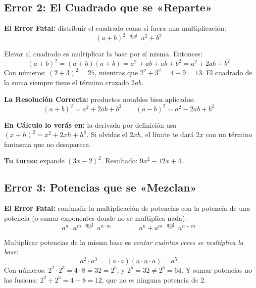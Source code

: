 \documentclass[12pt, letterpaper]{article}
\begin{document}
\subsection{Error 2: El Cuadrado que se «Reparte»}

\begin{cuadroadvertencia}
  \textbf{El Error Fatal:} distribuir el cuadrado como si fuera una multiplicación:
  \[
    (a + b)^2 \;\overset{\text{mal}}{=}\; a^2 + b^2
  \]
\end{cuadroadvertencia}

Elevar al cuadrado es multiplicar la base por sí misma. Entonces:
\[
  (a + b)^2 = (a + b)(a + b) = a^2 + ab + ab + b^2 = a^2 + 2ab + b^2
\]
Con números: $(2 + 3)^2 = 25$, mientras que $2^2 + 3^2 = 4 + 9 = 13$. El cuadrado de la suma siempre tiene el término cruzado $2ab$.

\begin{cuadrosolucion}
  \textbf{La Resolución Correcta:} productos notables bien aplicados:
  \[
    (a + b)^2 = a^2 + 2ab + b^2 \qquad (a - b)^2 = a^2 - 2ab + b^2
  \]
\end{cuadrosolucion}

\noindent\textbf{En Cálculo lo verás en:} la derivada por definición usa $(x + h)^2 = x^2 + 2xh + h^2$. Si olvidas el $2xh$, el límite te dará $2x$ con un término fantasma que no desaparece.

\noindent\textbf{Tu turno:} expande $(3x - 2)^2$. Resultado: $9x^2 - 12x + 4$.

\subsection{Error 3: Potencias que se «Mezclan»}

\begin{cuadroadvertencia}
  \textbf{El Error Fatal:} confundir la multiplicación de potencias con la potencia de una potencia (o sumar exponentes donde no se multiplica nada):
  \[
    a^n \cdot a^m \;\overset{\text{mal}}{=}\; a^{n \cdot m} \qquad\qquad
    a^n + a^m \;\overset{\text{mal}}{=}\; a^{n + m}
  \]
\end{cuadroadvertencia}

Multiplicar potencias de la misma base es \emph{contar cuántas veces se multiplica la base}:
\[
  a^2 \cdot a^3 = (a \cdot a)(a \cdot a \cdot a) = a^5
\]
Con números: $2^2 \cdot 2^3 = 4 \cdot 8 = 32 = 2^5$, y $2^5 = 32 \neq 2^6 = 64$. Y sumar potencias no las fusiona: $2^2 + 2^3 = 4 + 8 = 12$, que no es ninguna potencia de 2.
\end{document}
